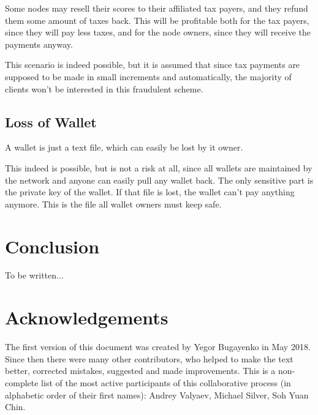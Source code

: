 \documentclass[11pt,oneside]{article}
\begin{document}
Some nodes may resell their scores to their affiliated tax payers, and they
refund them some amount of taxes back. This will be profitable both for
the tax payers, since they will pay less taxes, and for the node owners,
since they will receive the payments anyway.

This scenario is indeed possible, but it is assumed that since tax payments are
supposed to be made in small increments and automatically, the majority of
clients won't be interested in this fraudulent scheme.

\subsection{Loss of Wallet}

A wallet is just a text file, which can easily be lost by it owner.

This indeed is possible, but is not a risk at all, since all wallets are
maintained by the network and anyone can easily pull any wallet back.
The only sensitive part is the private key of the wallet. If that file
is lost, the wallet can't pay anything anymore. This is the file all
wallet owners must keep safe.

\section{Conclusion}

To be written...

\section{Acknowledgements}

The first version of this document was created by Yegor Bugayenko in May 2018.
Since then there were many other contributors, who helped to make the text better,
corrected mistakes, suggested and made improvements. This is a non-complete list
of the most active participants of this collaborative process
(in alphabetic order of their first names):
%
Andrey Valyaev,
Michael Silver,
Soh Yuan Chin.


\printbibliography%
\end{document}
